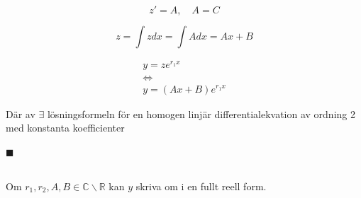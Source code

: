 \documentclass{article}
\begin{document}
\subsection*{}

\begin{equation}
    z' = A, \quad A = C
\end{equation}

\begin{equation}
    z = \int zdx = \int Adx = Ax + B
\end{equation}

\begin{equation}
\begin{gathered}
    y = ze^{r_1x}\\
    \Leftrightarrow\\
    y = (Ax + B)e^{r_1x}
\end{gathered}
\end{equation}

\noindent Där av $\exists$ lösningsformeln för en homogen linjär differentialekvation av ordning 2 med konstanta koefficienter

\begin{flushright}
    $\blacksquare$
\end{flushright}

\subsection*{}

\noindent Om $r_1,r_2,A,B \in \mathbb{C} \backslash  \mathbb{R}$ kan $y$ skriva om i en fullt reell form. 
\end{document}
